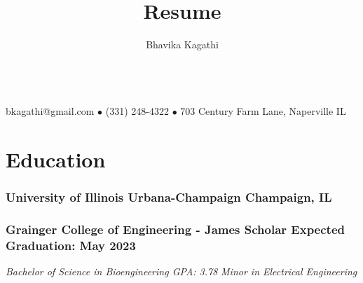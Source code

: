 \documentclass[10pt]{article}
\makeatletter
\renewcommand{\maketitle} %
        {
            \begin{center}
                {\huge\bfseries\theauthor}\\
                \vspace{.25em}
                bkagathi@gmail.com $\bullet$ (331) 248-4322 $\bullet$ 703 Century Farm Lane, Naperville IL
            \end{center}
            \vspace{-.7em}
            \titlerule[2pt]
        }
\makeatother
\begin{document}
    \title{Resume}
    \author{Bhavika Kagathi}
    \maketitle
    \thispagestyle{empty}

            \section{Education}
                                    \subsubsection{University of Illinois Urbana-Champaign \hfill {\normalsize Champaign, IL}}
                \subsubsection{Grainger College of Engineering - James Scholar \hfill {\normalsize \textnormal{Expected Graduation: May 2023}}}
                \noindent\ignorespaces
                \textit{Bachelor of Science in Bioengineering \hfill {\normalsize \textnormal{GPA: 3.78}}}
                                    \newline
                    \textit{Minor in Electrical Engineering}
\end{document}
